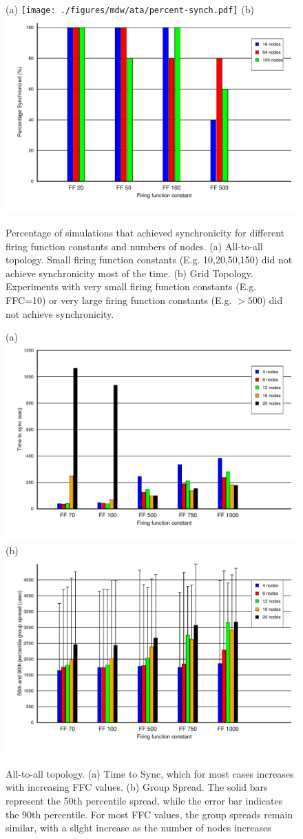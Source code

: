 \documentclass{sig-alternate}
\begin{document}
{%

\begin{figure}
\begin{center}
(a)
\texttt{[image: ./figures/mdw/ata/percent-synch.pdf]}
(b)
\includegraphics[width=0.4\hsize]{./figures/mdw/grid-synch/percent-synch-grid.pdf}
\end{center}
\caption{Percentage of simulations that achieved synchronicity for
different firing function constants and numbers of nodes. (a)
All-to-all topology. Small firing function constants
(E.g. 10,20,50,150) did not achieve synchronicity most of the
time. (b) Grid Topology. Experiments with very small firing function
constants (E.g. FFC=10) or very large firing function constants
(E.g. $>500$) did not achieve synchronicity.}
\label{fig:pcnt-synch-both}
\end{figure}

\begin{figure}
\centering
(a)
\includegraphics[width=0.4\linewidth]{./figures/mdw/ata/tts.pdf}
(b)
\includegraphics[width=0.4\linewidth]{./figures/mdw/ata/gs-ata.pdf}
\caption{All-to-all topology. (a) Time to Sync, which for most cases
increases with increasing FFC values. (b) Group Spread. The solid bars
represent the 50th percentile spread, while the error bar indicates
the 90th percentile. For most FFC values, the group spreads remain
similar, with a slight increase as the number of nodes increases}
\label{fig:ata}
\end{figure}

}
\end{document}
